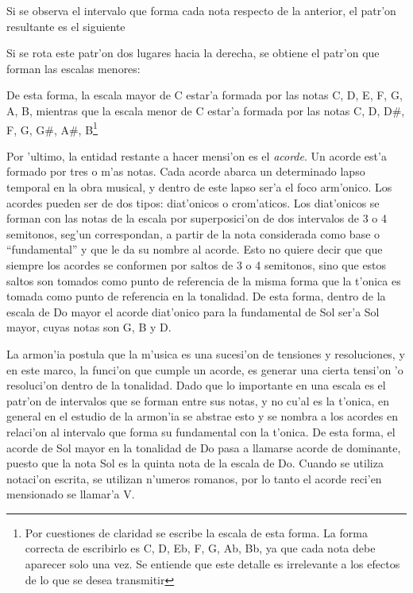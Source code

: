 Si se observa el intervalo que forma cada nota respecto de la anterior, el patr'on resultante es el siguiente

\begin{center}
      
\end{center}

Si se rota este patr'on dos lugares hacia la derecha, se obtiene el patr'on que forman las escalas menores:

\begin{center}
       
\end{center}

De esta forma, la escala mayor de C estar'a formada por las notas C, D, E, F, G, A, B, mientras que la escala menor de C estar'a formada
por las notas C, D, D\#, F, G, G\#, A\#, B\footnote{Por cuestiones de claridad se escribe la escala de esta forma. La forma correcta
de escribirlo es C, D, Eb, F, G, Ab, Bb, ya que cada nota debe aparecer solo una vez. Se entiende que este detalle es irrelevante a los efectos
de lo que se desea transmitir}


Por 'ultimo, la entidad restante a hacer mensi'on es el \emph{acorde}. Un acorde est'a formado por tres o m'as notas. Cada acorde abarca un determinado
lapso temporal en la obra musical, y dentro de este lapso ser'a el foco arm'onico. Los acordes pueden ser de dos tipos: diat'onicos o crom'aticos. 
Los diat'onicos se forman con las notas de la escala por superposici'on de dos intervalos de 3 o 4 semitonos, seg'un correspondan, a partir de la nota 
considerada como base o ``fundamental'' y que le da su nombre al acorde. 
Esto no quiere decir que que siempre los acordes se conformen por saltos de 3 o 4 semitonos, sino que estos saltos son tomados como punto de referencia
de la misma forma que la t'onica es tomada como punto de referencia en la tonalidad.
De esta forma, dentro de la escala de Do mayor el acorde diat'onico para la fundamental de Sol ser'a Sol mayor, cuyas notas son G, B y D. 

La armon'ia postula que la m'usica es una sucesi'on de tensiones y resoluciones, y en este marco, la funci'on que cumple un acorde, es generar una cierta
tensi'on 'o resoluci'on dentro de la tonalidad. Dado que lo importante en una escala es el patr'on de intervalos que se forman entre sus notas, y 
no cu'al es la t'onica, en general en el estudio de la armon'ia se abstrae esto y se nombra a los acordes en relaci'on al intervalo que forma su
fundamental con la t'onica. De esta forma, el acorde de Sol mayor en la tonalidad de Do pasa a llamarse acorde de dominante, puesto que la nota Sol
es la quinta nota de la escala de Do. Cuando se utiliza notaci'on escrita, se utilizan n'umeros romanos, por lo tanto el acorde reci'en mensionado
se llamar'a V. 

